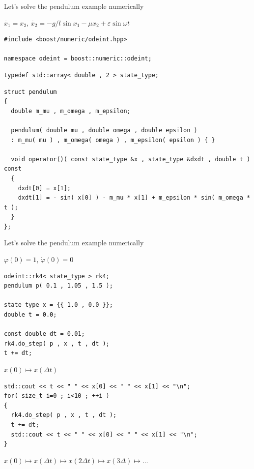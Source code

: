 \begin{frame}[fragile]

\centerline{ \Large Let's solve the pendulum example numerically}
$\dot{x_1} = x_2$, $\dot{x_2} = - g / l \sin x_1 - \mu x_2 + \varepsilon \sin \omega t$

\begin{lstlisting}
#include <boost/numeric/odeint.hpp>

namespace odeint = boost::numeric::odeint;
\end{lstlisting}

\begin{lstlisting}
typedef std::array< double , 2 > state_type;
\end{lstlisting}

\begin{lstlisting}
struct pendulum
{
  double m_mu , m_omega , m_epsilon;

  pendulum( double mu , double omega , double epsilon )
  : m_mu( mu ) , m_omega( omega ) , m_epsilon( epsilon ) { }

  void operator()( const state_type &x , state_type &dxdt , double t ) const
  {
    dxdt[0] = x[1];
    dxdt[1] = - sin( x[0] ) - m_mu * x[1] + m_epsilon * sin( m_omega * t );
  }
};
\end{lstlisting}

\end{frame}

\begin{frame}[fragile]
 \centerline{ \Large Let's solve the pendulum example numerically}

$\varphi(0) = 1$, $\dot{\varphi}(0) = 0$

\begin{lstlisting}
odeint::rk4< state_type > rk4;
pendulum p( 0.1 , 1.05 , 1.5 );

state_type x = {{ 1.0 , 0.0 }};
double t = 0.0;

const double dt = 0.01;
rk4.do_step( p , x , t , dt );
t += dt;
\end{lstlisting}

$x(0) \mapsto x(\Delta t)$

\begin{lstlisting}
std::cout << t << " " << x[0] << " " << x[1] << "\n";
for( size_t i=0 ; i<10 ; ++i )
{
  rk4.do_step( p , x , t , dt );
  t += dt;
  std::cout << t << " " << x[0] << " " << x[1] << "\n";
}
\end{lstlisting}

$x(0) \mapsto x(\Delta t) \mapsto x(2\Delta t) \mapsto x(3\Delta) \mapsto \dots$

\end{frame}



